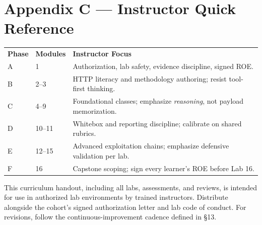 \documentclass[11pt,letterpaper,oneside]{report}
\renewcommand{\arraystretch}{1.18}
\begin{document}
\chapter*{Appendix C --- Instructor Quick Reference}

\renewcommand{\arraystretch}{1.18}
\begin{tabularx}{\linewidth}{@{}R{2.4cm} R{3.4cm} >{\RaggedRight\arraybackslash}X@{}}
\\
\toprule
\sffamily\bfseries Phase & \sffamily\bfseries Modules & \sffamily\bfseries Instructor Focus \\
\midrule
A & 1     & Authorization, lab safety, evidence discipline, signed ROE.\\
B & 2--3  & HTTP literacy and methodology authoring; resist tool-first thinking.\\
C & 4--9  & Foundational classes; emphasize \emph{reasoning}, not payload memorization.\\
D & 10--11 & Whitebox and reporting discipline; calibrate on shared rubrics.\\
E & 12--15 & Advanced exploitation chains; emphasize defensive validation per lab.\\
F & 16    & Capstone scoping; sign every learner's ROE before Lab 16.\\
\bottomrule
\end{tabularx}

\vfill
\begin{infobox}
This curriculum handout, including all labs, assessments, and reviews, is intended for use in authorized lab environments by trained instructors. Distribute alongside the cohort's signed authorization letter and lab code of conduct. For revisions, follow the continuous-improvement cadence defined in \S13.
\end{infobox}
\end{document}
